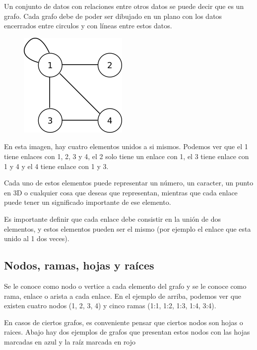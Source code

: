 \documentclass{article}
\begin{document}
Un conjunto de datos con relaciones entre otros datos se puede decir que es un grafo. Cada grafo debe de poder ser dibujado en un plano con los datos encerrados entre circulos y con líneas entre estos datos.

\begin{figure}[H]
    \centering
    \includegraphics[width=0.15\paperwidth]{grafo}
\end{figure}

En esta imagen, hay cuatro elementos unidos a si mismos. Podemos ver que el 1 tiene enlaces con 1, 2, 3 y 4, el 2 solo tiene un enlace con 1, el 3 tiene enlace con 1 y 4 y el 4 tiene enlace con 1 y 3.

Cada uno de estos elementos puede representar un número, un caracter, un punto en 3D o cualquier cosa que deseas que representan, mientras que cada enlace puede tener un significado importante de ese elemento.

Es importante definir que cada enlace debe consistir en la unión de dos elementos, y estos elementos pueden ser el mismo (por ejemplo el enlace que esta unido al 1 dos veces).

\subsection{Nodos, ramas, hojas y raíces}

Se le conoce como nodo o vertice a cada elemento del grafo y se le conoce como rama, enlace o arista a cada enlace. En el ejemplo de arriba, podemos ver que existen cuatro nodos (1, 2, 3, 4) y cinco ramas (1:1, 1:2, 1:3, 1:4, 3:4).

En casos de ciertos grafos, es conveniente pensar que ciertos nodos son hojas o raices. Abajo hay dos ejemplos de grafos que presentan estos nodos con las hojas marcadas en azul y la raíz marcada en rojo
\end{document}
